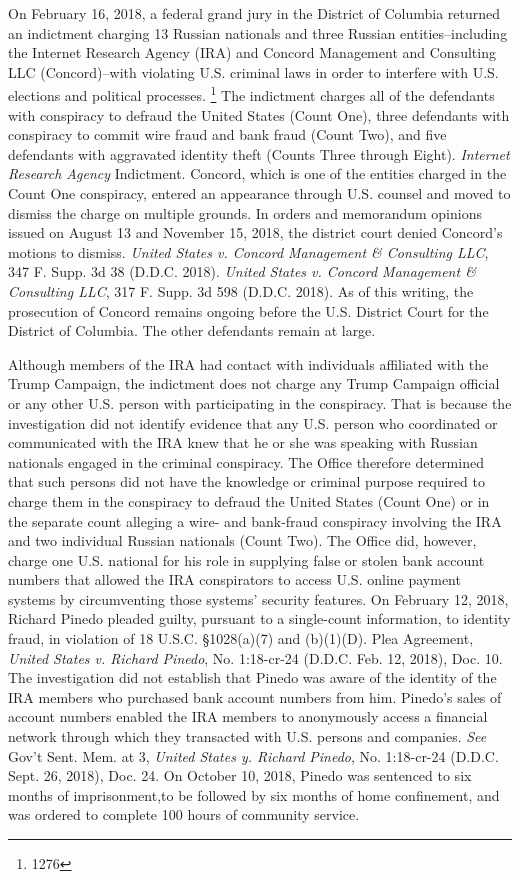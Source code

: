 On February 16, 2018, a federal grand jury in the District of Columbia returned an indictment charging 13 Russian nationals and three Russian entities--including the Internet Research Agency (IRA) and Concord Management and Consulting LLC (Concord)--with violating U.S. criminal laws in order to interfere with U.S. elections and political processes.%
\footnote{1276}
The indictment charges all of the defendants with conspiracy to defraud the United States (Count One), three defendants with conspiracy to commit wire fraud and bank fraud (Count Two), and five defendants with aggravated identity theft (Counts Three through Eight).
\textit{Internet Research Agency} Indictment. 
Concord, which is one of the entities charged in the Count One conspiracy, entered an appearance through U.S. counsel and moved to dismiss the charge on multiple grounds. 
In orders and memorandum opinions issued on August 13 and November 15, 2018, the district court denied Concord's motions to dismiss. 
\textit{United States v. Concord Management & Consulting LLC}, 347 F. Supp. 3d 38 (D.D.C. 2018). 
\textit{United States v. Concord Management & Consulting LLC}, 317 F. Supp. 3d 598 (D.D.C. 2018). 
As of this writing, the prosecution of Concord remains ongoing before the U.S. District Court for the District of Columbia. 
The other defendants remain at large.

Although members of the IRA had contact with individuals affiliated with the Trump Campaign, the indictment does not charge any Trump Campaign official or any other U.S. person with participating in the conspiracy. 
That is because the investigation did not identify evidence that any U.S. person who coordinated or communicated with the IRA knew that he or she was speaking with Russian nationals engaged in the criminal conspiracy. 
The Office therefore determined that such persons did not have the knowledge or criminal purpose required to charge them in the conspiracy to defraud the United States (Count One) or in the separate count alleging a wire- and bank-fraud conspiracy involving the IRA and two individual Russian nationals (Count Two).
The Office did, however, charge one U.S. national for his role in supplying false or stolen bank account numbers that allowed the IRA conspirators to access U.S. online payment systems by circumventing those systems' security features. 
On February 12, 2018, Richard Pinedo pleaded guilty, pursuant to a single-count information, to identity fraud, in violation of 18 U.S.C. \S 1028(a)(7) and (b)(1)(D). 
Plea Agreement, \textit{United States v. Richard Pinedo}, No. 1:18-cr-24 (D.D.C. Feb. 12, 2018), Doc. 10. 
The investigation did not establish that Pinedo was aware of the identity of the IRA members who purchased bank account numbers from him. 
Pinedo's sales of account numbers enabled the IRA members to anonymously access a financial network through which they transacted with U.S. persons and companies. 
\textit{See} Gov't Sent. Mem. at 3, \textit{United States y. Richard Pinedo}, No. 1:18-cr-24 (D.D.C. Sept. 26, 2018), Doc. 24. 
On October 10, 2018, Pinedo was sentenced to six months of imprisonment,to be followed by six months of home confinement, and was ordered to complete 100 hours of community service.

